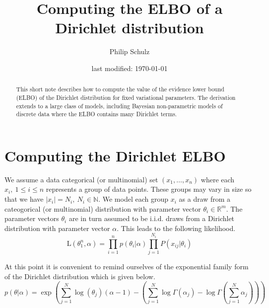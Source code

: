 \documentclass[a4paper, 11pt]{article}
\author{Philip Schulz}
\title{Computing the ELBO of a Dirichlet distribution}
\date{last modified: \today}
\begin{document}
\maketitle

\begin{abstract}
This short note describes how to compute the value of the evidence lower bound (ELBO) of the Dirichlet distribution for fixed variational parameters. The derivation extends to a large class of models, including
Bayesian non-parametric models of discrete data where the ELBO contains many Dirichlet terms.
\end{abstract}

\section{Computing the Dirichlet ELBO}

We assume a data categorical (or multinomial) set $ (x_{1}, \ldots, x_{n}) $ where each $ x_{i},\ 1 \leq i \leq n $ represents a group of data points. These groups may
vary in size so that we have $ |x_{i}| = N_{i},\ N_{i} \in \mathbb{N} $. We model each group $ x_{i} $ as a draw from a cateogorical (or multinomial) distribution
with parameter vector $ \theta_{i} \in \mathbb{R}^{m} $. The parameter vectors $ \theta_{i} $ are in turn assumed to be i.i.d. draws from a Dirichlet distribution with 
parameter vector $ \alpha $. This leads to the following likelihood.
\begin{equation}
\text{L}(\theta_{1}^{n}, \alpha) = \prod_{i=1}^{n}p(\theta_{i}|\alpha)\prod_{j=1}^{N_{i}}P(x_{ij}|\theta_{i})
\end{equation}

At this point it is convenient to remind ourselves of the exponential family form of the Dirichlet distribution which is given below.
\begin{equation} \label{eq:expFam}
p(\theta|\alpha) = \exp\left(\sum_{j=1}^{N}\log(\theta_{j})(\alpha-1) - \left(\sum_{j=1}^{N}\log\Gamma(\alpha_{j}) - \log\Gamma\left(\sum_{j=1}^{N}\alpha_{j}\right)\right) \right)
\end{equation}
\end{document}
